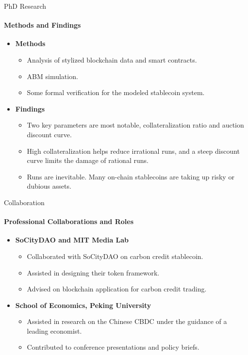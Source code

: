 \documentclass{beamer}
\begin{document}
\begin{frame}{PhD Research}
\framesubtitle{Methods and Findings}

\begin{itemize}
\item \textbf{Methods}
\begin{itemize}
\item Analysis of stylized blockchain data and smart contracts.
\item ABM simulation. 
\item Some formal verification for the modeled stablecoin system.
\end{itemize}

\item \textbf{Findings}
\begin{itemize}
\item Two key parameters are most notable, collateralization ratio and auction discount curve.
\item High collateralization helps reduce irrational runs, and a steep discount curve limits the damage of rational runs. 
\item Runs are inevitable. Many on-chain stablecoins are taking up risky or dubious assets.  
\end{itemize}
\end{itemize}
\end{frame}


\begin{frame}{Collaboration}
\framesubtitle{Professional Collaborations and Roles}
\begin{itemize}
\item \textbf{SoCityDAO and MIT Media Lab}
\begin{itemize}
\item Collaborated with SoCityDAO on carbon credit stablecoin.
\item Assisted in designing their token framework.
\item Advised on blockchain application for carbon credit trading.
\end{itemize}
\item \textbf{School of Economics, Peking University}
\begin{itemize}
\item Assisted in research on the Chinese CBDC under the guidance of a leading economist.
\item Contributed to conference presentations and policy briefs.
\end{itemize}
\end{itemize}
\end{frame}
\end{document}
